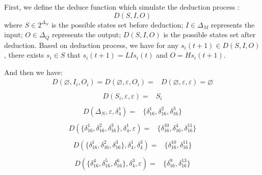 \documentclass[letterpaper, 10 pt, conference]{ieeeconf}  %
\begin{document}
First, we define the deduce function  which simulate the deduction process :
$$D\left(S, I, O\right)$$
where $S\in 2^{\Delta_N}$ is the possible states set before deduction; $I\in\Delta_M$ represents the input; $O\in\Delta_Q$ represents the output; $D\left(S, I, O\right)$ is the possible states set after deduction. Based on deduction process, we have for any $s_i(t+1)\in D\left(S, I, O\right)$, there exists $s_i\in S$ that $s_i(t+1)=LIs_i(t)$ and $O=Hs_i(t+1)$.

And then we have:
\begin{equation}
\begin{split}
D\left(\varnothing,I_i,O_i\right)=D\left(\varnothing,\varepsilon,O_i\right)=&D\left(\varnothing,\varepsilon,\varepsilon\right)=\varnothing\\
\end{split}
\end{equation}
\begin{equation}
\begin{split}
D\left(S_i,\varepsilon,\varepsilon\right)=&S_i\\
\end{split}
\end{equation}
\begin{equation}
\begin{split}
D\left(\Delta_N,\varepsilon,\delta_4^1\right)=&\{\delta_{16}^1,\delta_{16}^2,\delta_{16}^3\}\\
\end{split}
\end{equation}
\begin{equation}
\begin{split}
D\left(\{\delta_{16}^1,\delta_{16}^2,\delta_{16}^3\},\delta_4^1,\varepsilon\right)=&\{\delta_{16}^{10},\delta_{16}^4,\delta_{16}^{11}\}\\
\end{split}
\end{equation}
\begin{equation}
\begin{split}
D\left(\{\delta_{16}^1,\delta_{16}^2,\delta_{16}^3\},\delta_4^1,\delta_4^3\right)=&\{\delta_{16}^{10},\delta_{16}^{11}\}\\
\end{split}
\end{equation}
\begin{equation}
\begin{split}
D\left(\{\delta_{16}^4,\delta_{16}^5,\delta_{16}^6\},\delta_4^3,\varepsilon\right)=&\{\delta_{16}^9,\delta_{16}^{13}\}
\end{split}
\end{equation}
\end{document}
